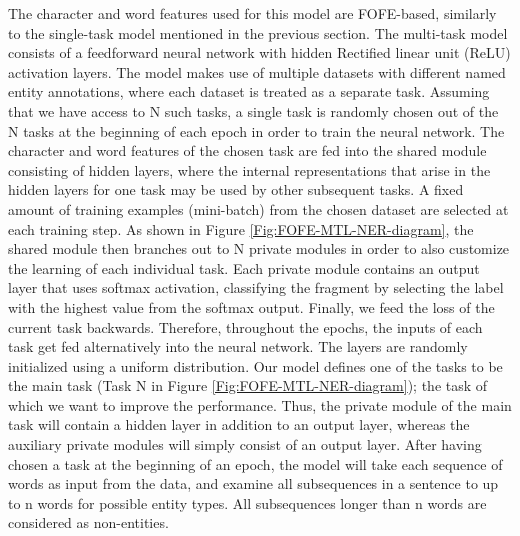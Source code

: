 \documentclass[11pt]{article}
\begin{document}
The character and word features used for this model are FOFE-based, similarly to the single-task model mentioned in the previous section. The multi-task model consists of a feedforward neural network with hidden Rectified linear unit (ReLU) \cite{Nair:2010:RLU:3104322.3104425} activation layers. The model makes use of multiple datasets with different named entity annotations, where each dataset is treated as a separate task. Assuming that we have access to N such tasks, a single task is randomly chosen out of the N tasks at the beginning of each epoch in order to train the neural network. The character and word features of the chosen task are fed into the shared module consisting of hidden layers, where the internal representations that arise in the hidden layers for one task may be used by other subsequent tasks. A fixed amount of training examples (mini-batch) from the chosen dataset are selected at each training step. As shown in Figure \ref{Fig:FOFE-MTL-NER-diagram}, the shared module then branches out to N private modules in order to also customize the learning of each individual task. Each private module contains an output layer that uses softmax activation, classifying the fragment by selecting the label with the highest value from the softmax output. Finally, we feed the loss of the current task backwards. Therefore, throughout the epochs, the inputs of each task get fed alternatively into the neural network. The layers are randomly initialized using a uniform distribution. Our model defines one of the tasks to be the main task (Task N in Figure \ref{Fig:FOFE-MTL-NER-diagram}); the task of which we want to improve the performance. Thus, the private module of the main task will contain a hidden layer in addition to an output layer, whereas the auxiliary private modules will simply consist of an output layer. After having chosen a task at the beginning of an epoch, the model will take each sequence of words as input from the data, and examine all subsequences in a sentence to up to n words for possible entity types. All subsequences longer than n words are considered as non-entities. 
\end{document}

